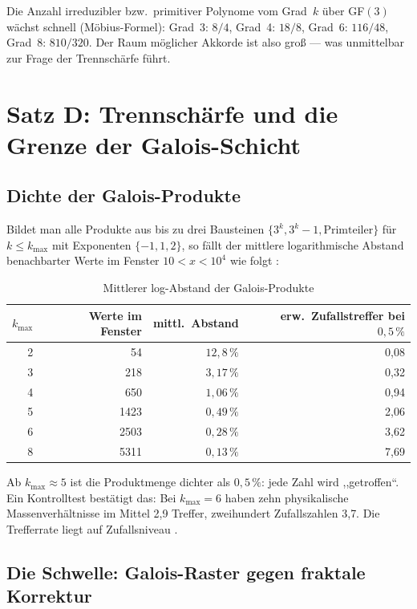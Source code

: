Die Anzahl irreduzibler bzw.\ primitiver Polynome vom Grad~$k$ über GF$(3)$
wächst schnell (Möbius-Formel): Grad~3: $8/4$, Grad~4: $18/8$, Grad~6: $116/48$,
Grad~8: $810/320$. Der Raum möglicher Akkorde ist also groß --- was unmittelbar
zur Frage der Trennschärfe führt.

\section{Satz D: Trennschärfe und die Grenze der Galois-Schicht}

\subsection{Dichte der Galois-Produkte}

Bildet man alle Produkte aus bis zu drei Bausteinen $\{3^k, 3^k - 1, \text{Primteiler}\}$
für $k \leq k_\text{max}$ mit Exponenten $\{-1, 1, 2\}$, so fällt der mittlere
logarithmische Abstand benachbarter Werte im Fenster $10 < x < 10^4$ wie folgt \BM:

\begin{table}[H]
\centering
\caption{Mittlerer log-Abstand der Galois-Produkte}
\begin{tabular}{rrrr}
\toprule
$k_\text{max}$ & Werte im Fenster & mittl.\ Abstand & erw.\ Zufallstreffer bei $0{,}5\,\%$ \\
\midrule
2 & 54 & $12{,}8\,\%$ & 0{,}08 \\
3 & 218 & $3{,}17\,\%$ & 0{,}32 \\
4 & 650 & $1{,}06\,\%$ & 0{,}94 \\
5 & 1423 & $0{,}49\,\%$ & 2{,}06 \\
6 & 2503 & $0{,}28\,\%$ & 3{,}62 \\
8 & 5311 & $0{,}13\,\%$ & 7{,}69 \\
\bottomrule
\end{tabular}
\end{table}

Ab $k_\text{max} \approx 5$ ist die Produktmenge dichter als $0{,}5\,\%$: jede Zahl
wird ,,getroffen``. Ein Kontrolltest bestätigt das: Bei $k_\text{max} = 6$ haben
zehn physikalische Massenverhältnisse im Mittel 2{,}9 Treffer, zweihundert
Zufallszahlen 3{,}7. Die Trefferrate liegt auf Zufallsniveau \BM.

\subsection{Die Schwelle: Galois-Raster gegen fraktale Korrektur}

